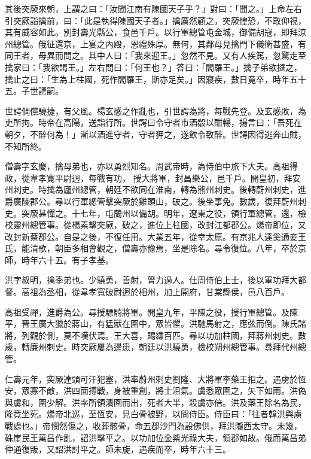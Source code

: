 \begin{pinyinscope}
 其後突厥來朝，上謂之曰：「汝聞江南有陳國天子乎？」對曰：「聞之。」上命左右引突厥詣擒前，曰：「此是執得陳國天子者。」擒厲然顧之，突厥惶恐，不敢仰視，其有威容如此。別封壽光縣公，食邑千戶。以行軍總管屯金城，御備胡寇，即拜涼州總管。俄征還京，上宴之內殿，恩禮殊厚。無何，其鄰母見擒門下儀衛甚盛，有同王者，母異而問之。其中人曰：「我來迎王。」忽然不見。又有人疾篤，忽驚走至
 擒家曰：「我欲謁王。」左右問曰：「何王也？」答曰：「閻羅王。」擒子弟欲撻之，擒止之曰：「生為上柱國，死作閻羅王，斯亦足矣。」因寢疾，數日竟卒，時年五十五。子世諤嗣。



 世諤倜儻驍捷，有父風。楊玄感之作亂也，引世諤為將，每戰先登。及玄感敗，為吏所拘。時帝在高陽，送詣行所。世諤曰令守者市酒殽以酣暢，揚言曰：「吾死在朝夕，不醉何為！」漸以酒進守者，守者狎之，遂飲令致醉。世諤因得逃奔山賊，不知所終。



 僧壽字玄慶，擒母弟也，亦以勇烈知名。周武帝時，為侍伯中旅下大夫。高祖得政，從韋孝寬平尉迥，每戰有功，
 授大將軍，封昌樂公，邑千戶。開皇初，拜安州刺史。時擒為廬州總管，朝廷不欲同在淮南，轉為熊州刺史。後轉蔚州刺史，進爵廣陵郡公。尋以行軍總管擊突厥於雞頭山，破之。後坐事免。數歲，復拜蔚州刺史。突厥甚憚之。十七年，屯蘭州以備胡。明年，遼東之役，領行軍總管，還，檢校靈州總管事。從楊素擊突厥，破之，進位上柱國，改封江都郡公。煬帝即位，又改封新蔡郡公。自是之後，不復任用。大業五年，從幸太原。有京兆人達奚通妾王氏，能清歌，朝臣多相會觀之，僧壽亦豫焉，坐是除名。尋令復位。八年，卒於京師，時年六十五。有子孝基。



 洪字叔明，擒季弟也。少驍勇，善射，膂力過人。仕周侍伯上士，後以軍功拜大都督。高祖為丞相，從韋孝寬破尉迥於相州，加上開府，甘棠縣侯，邑八百戶。



 高祖受禪，進爵為公。尋授驃騎將軍。開皇九年，平陳之役，授行軍總管。及陳平，晉王廣大獵於蔣山，有猛獸在圍中，眾皆懼。洪馳馬射之，應弦而倒。陳氏諸將，列觀於側，莫不嘆伏焉。王大喜，賜縑百匹。尋以功加柱國，拜蔣州刺史。數歲，轉廉州刺史。時突厥屢為邊患，朝廷以洪驍勇，檢校朔州總管事。尋拜代州總管。



 仁壽元年，突厥達頭可汗犯塞，洪率蔚州刺史劉隆、大將軍李藥王拒之。遇虜於恆
 安，眾寡不敵，洪四面搏戰，身被重創，將士沮氣。虜悉眾圍之，矢下如雨。洪偽與虜和，圍少解。洪率所領潰圍而出，死者大半，殺虜亦倍。洪及藥王除名為民，隆竟坐死。煬帝北巡，至恆安，見白骨被野，以問侍臣。侍臣曰：「往者韓洪與虜戰處也。」帝憫然傷之，收葬骸骨，命五郡沙門為設佛供，拜洪隴西太守。未幾，硃崖民王萬昌作亂，詔洪擊平之。以功加位金紫光祿大夫，領郡如故。俄而萬昌弟仲通復叛，又詔洪討平之。師未旋，遇疾而卒，時年六十三。




\end{pinyinscope}
